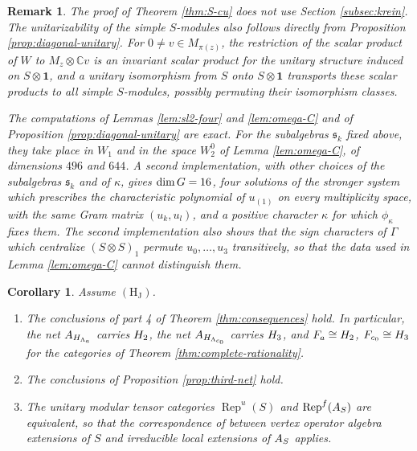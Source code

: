 \documentclass[leqno]{article}
\newcommand{\Cbb}{\ensuremath{\mathbb{C}}}
\let\cal\relax
\newcommand{\cal}{\mathcal}
\newcommand{\ot}{\otimes}
\DeclareMathOperator{\Rep}{Rep} %
\newtheorem{cor}[thm]{Corollary}
\newtheorem{remark}[thm]{Remark}
\numberwithin{equation}{section}
\begin{document}
\begin{remark}\normalfont
\label{rem:S-cu-computations}
The proof of Theorem \ref{thm:S-cu} does not use Section \ref{subsec:krein}. The unitarizability of the simple $S$-modules also follows directly from Proposition \ref{prop:diagonal-unitary}. For $0 \neq v \in M_{\pi(z)}$, the restriction of the scalar product of $W$ to $M_z \ot \Cbb v$ is an invariant scalar product for the unitary structure induced on $S \ot \mathbf 1$, and a unitary isomorphism from $S$ onto $S \ot \mathbf 1$ transports these scalar products to all simple $S$-modules, possibly permuting their isomorphism classes.

The computations of Lemmas \ref{lem:sl2-four} and \ref{lem:omega-C} and of Proposition \ref{prop:diagonal-unitary} are exact. For the subalgebras $\mathfrak s_k$ fixed above, they take place in $W_1$ and in the space $W_2^0$ of Lemma \ref{lem:omega-C}, of dimensions $496$ and $644$. A second implementation, with other choices of the subalgebras $\mathfrak s_k$ and of $\kappa$, gives $\dim\cal G = 16$, four solutions of the stronger system which prescribes the characteristic polynomial of $u_{(1)}$ on every multiplicity space, with the same Gram matrix $(u_k,u_l)$, and a positive character $\kappa$ for which $\phi_\kappa$ fixes them. The second implementation also shows that the sign characters of $\Gamma$ which centralize $(S \ot S)_1$ permute $u_0, \ldots, u_3$ transitively, so that the data used in Lemma \ref{lem:omega-C} cannot distinguish them.
\end{remark}

\begin{cor}
\label{cor:N-consequences}
Assume $\mathrm{(H_J)}$.
\begin{enumerate}
\item The conclusions of part 4 of Theorem \ref{thm:consequences} hold. In particular, the net $\cal A_{H_{\Lambda_a}}$ carries $\cal H_2$, the net $\cal A_{H_{\Lambda_{c_0}}}$ carries $\cal H_3$, and $\cal F_a \cong \cal H_2$, $\cal F_{c_0} \cong \cal H_3$ for the categories of Theorem \ref{thm:complete-rationality}.
\item The conclusions of Proposition \ref{prop:third-net} hold.
\item The unitary modular tensor categories $\Rep^u(S)$ and $\Rep^f(\cal A_S)$ are equivalent, so that the correspondence of \cite[Theorem 4.10 p.~21]{CGGH23} between vertex operator algebra extensions of $S$ and irreducible local extensions of $\cal A_S$ applies.
\end{enumerate}
\end{cor}
\end{document}
